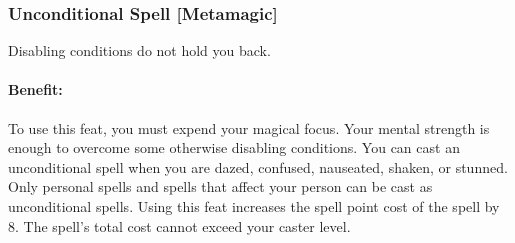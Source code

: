 \subsubsection[Unconditional Spell]{Unconditional Spell [Metamagic]}
\label{Feat:UnconditionalSpell}
Disabling conditions do not hold you back.

\paragraph{Benefit:} To use this feat, you must expend your magical focus. Your mental strength is enough to overcome some otherwise disabling conditions. You can cast an unconditional spell when you are dazed, confused, nauseated, shaken, or stunned.
Only personal spells and spells that affect your person can be cast as unconditional spells.
Using this feat increases the spell point cost of the spell by 8. The spell's total cost cannot exceed your caster level.